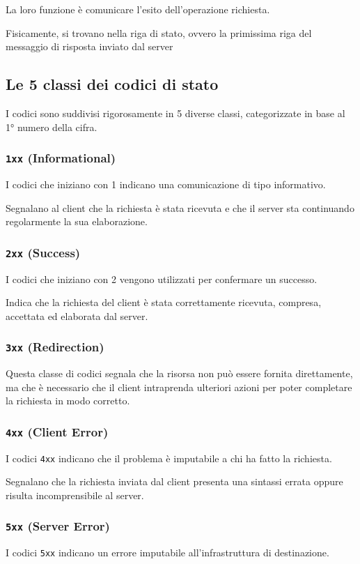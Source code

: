 La loro funzione è comunicare l'esito dell'operazione richiesta.

Fisicamente, si trovano nella riga di stato, ovvero la primissima riga del messaggio di risposta inviato dal server

\subsection{Le 5 classi dei codici di stato}
I codici sono suddivisi rigorosamente in 5 diverse classi, categorizzate in base al 1° numero della cifra.

\subsubsection{\texttt{1xx} (Informational)}
I codici che iniziano con 1 indicano una comunicazione di tipo informativo.

Segnalano al client che la richiesta è stata ricevuta e che il server sta continuando regolarmente la sua elaborazione.

\subsubsection{\texttt{2xx} (Success)}
I codici che iniziano con 2 vengono utilizzati per confermare un successo.

Indica che la richiesta del client è stata correttamente ricevuta, compresa, accettata ed elaborata dal server.

\subsubsection{\texttt{3xx} (Redirection)}
Questa classe di codici segnala che la risorsa non può essere fornita direttamente, ma che è necessario che il client intraprenda ulteriori azioni per poter completare la richiesta in modo corretto.

\subsubsection{\texttt{4xx} (Client Error)}
I codici \texttt{4xx} indicano che il problema è imputabile a chi ha fatto la richiesta.

Segnalano che la richiesta inviata dal client presenta una sintassi errata oppure risulta incomprensibile al server.

\subsubsection{\texttt{5xx} (Server Error)}
I codici \texttt{5xx} indicano un errore imputabile all'infrastruttura di destinazione.

